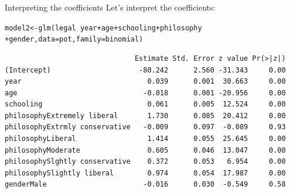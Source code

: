 \documentclass{beamer}\usepackage[]{graphicx}\usepackage[]{color}
\makeatletter
\newcommand{\hlopt}[1]{\textcolor[rgb]{1,0.894,0.769}{#1}}%
\newcommand{\hlstd}[1]{\textcolor[rgb]{1,0.894,0.769}{#1}}%
\newcommand{\hlkwb}[1]{\textcolor[rgb]{0.804,0.776,0.451}{#1}}%
\newcommand{\hlkwc}[1]{\textcolor[rgb]{0.78,0.941,0.545}{#1}}%
\newcommand{\hlkwd}[1]{\textcolor[rgb]{1,0.78,0.769}{#1}}%
\newenvironment{kframe}{%
 \def\at@end@of@kframe{}%
 \ifinner\ifhmode%
  \def\at@end@of@kframe{\end{minipage}}%
  \begin{minipage}{\columnwidth}%
 \fi\fi%
 \def\FrameCommand##1{\hskip\@totalleftmargin \hskip-\fboxsep
 \colorbox{shadecolor}{##1}\hskip-\fboxsep
     \hskip-\linewidth \hskip-\@totalleftmargin \hskip\columnwidth}%
 \MakeFramed {\advance\hsize-\width
   \@totalleftmargin\z@ \linewidth\hsize
   \@setminipage}}%
 {\par\unskip\endMakeFramed%
 \at@end@of@kframe}
\newenvironment{knitrout}{}{} %
\makeatother
\begin{document}
\begin{darkframes}
    \begin{frame}[fragile]{Interpreting the coefficients}
      Let's interpret the coefficients:
      \fontsize{9}{9}\selectfont
\begin{knitrout}
\begin{kframe}
\begin{alltt}
\hlstd{model2} \hlkwb{<-} \hlkwd{glm}\hlstd{(legal} \hlopt{~} \hlstd{year} \hlopt{+} \hlstd{age} \hlopt{+} \hlstd{schooling} \hlopt{+} \hlstd{philosophy}
                      \hlopt{+} \hlstd{gender,} \hlkwc{data}\hlstd{=pot,} \hlkwc{family}\hlstd{=binomial)}
\end{alltt}
\end{kframe}
\end{knitrout}
\begin{knitrout}
\begin{kframe}
\begin{verbatim}
                               Estimate Std. Error z value Pr(>|z|)
(Intercept)                     -80.242      2.560 -31.343     0.00
year                              0.039      0.001  30.663     0.00
age                              -0.018      0.001 -20.956     0.00
schooling                         0.061      0.005  12.524     0.00
philosophyExtremely liberal       1.730      0.085  20.412     0.00
philosophyExtrmly conservative   -0.009      0.097  -0.089     0.93
philosophyLiberal                 1.414      0.055  25.645     0.00
philosophyModerate                0.605      0.046  13.047     0.00
philosophySlghtly conservative    0.372      0.053   6.954     0.00
philosophySlightly liberal        0.974      0.054  17.987     0.00
genderMale                       -0.016      0.030  -0.549     0.58
\end{verbatim}
\end{kframe}
\end{knitrout}
    \end{frame}


\end{darkframes}
\end{document}
